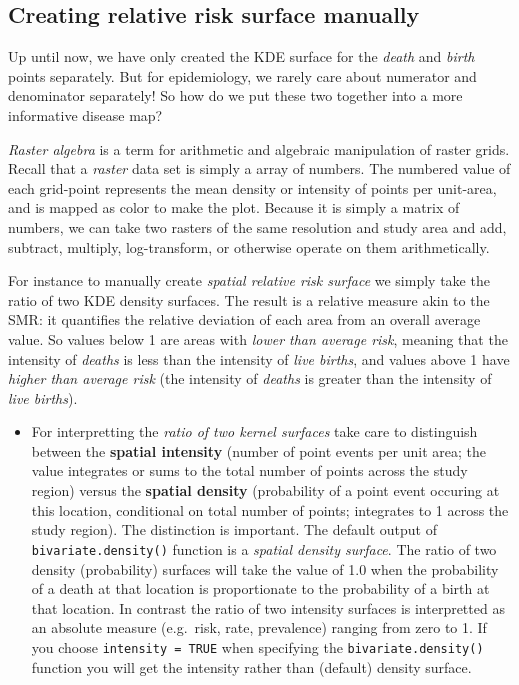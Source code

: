 \documentclass[
]{book}
\newcommand{\passthrough}[1]{#1}
\newenvironment{rmdblock}[1]
  {%
  \begin{itemize}
  \renewcommand{\labelitemi}{
    \raisebox{-.7\height}[0pt][0pt]{
      {\setkeys{Gin}{width=3em,keepaspectratio}\texttt{[image: images/\#1]}}
    }
  }
  \item
  }
  {
  \end{itemize}
  }
\newenvironment{rmdnote}
  {\begin{rmdblock}{note}}
  {\end{rmdblock}}
\begin{document}
\hypertarget{creating-relative-risk-surface-manually}{%
\subsection{Creating relative risk surface manually}\label{creating-relative-risk-surface-manually}}

Up until now, we have only created the KDE surface for the \emph{death} and \emph{birth} points separately. But for epidemiology, we rarely care about numerator and denominator separately! So how do we put these two together into a more informative disease map?

\emph{Raster algebra} is a term for arithmetic and algebraic manipulation of raster grids. Recall that a \emph{raster} data set is simply a array of numbers. The numbered value of each grid-point represents the mean density or intensity of points per unit-area, and is mapped as color to make the plot. Because it is simply a matrix of numbers, we can take two rasters of the same resolution and study area and add, subtract, multiply, log-transform, or otherwise operate on them arithmetically.

For instance to manually create \emph{spatial relative risk surface} we simply take the ratio of two KDE density surfaces. The result is a relative measure akin to the SMR: it quantifies the relative deviation of each area from an overall average value. So values below 1 are areas with \emph{lower than average risk}, meaning that the intensity of \emph{deaths} is less than the intensity of \emph{live births}, and values above 1 have \emph{higher than average risk} (the intensity of \emph{deaths} is greater than the intensity of \emph{live births}).

\begin{rmdnote}
For interpretting the \emph{ratio of two kernel surfaces} take care to distinguish between the \textbf{spatial intensity} (number of point events per unit area; the value integrates or sums to the total number of points across the study region) versus the \textbf{spatial density} (probability of a point event occuring at this location, conditional on total number of points; integrates to 1 across the study region). The distinction is important. The default output of \passthrough{\lstinline!bivariate.density()!} function is a \emph{spatial density surface}. The ratio of two density (probability) surfaces will take the value of 1.0 when the probability of a death at that location is proportionate to the probability of a birth at that location. In contrast the ratio of two intensity surfaces is interpretted as an absolute measure (e.g.~risk, rate, prevalence) ranging from zero to 1. If you choose \passthrough{\lstinline!intensity = TRUE!} when specifying the \passthrough{\lstinline!bivariate.density()!} function you will get the intensity rather than (default) density surface.
\end{rmdnote}
\end{document}
